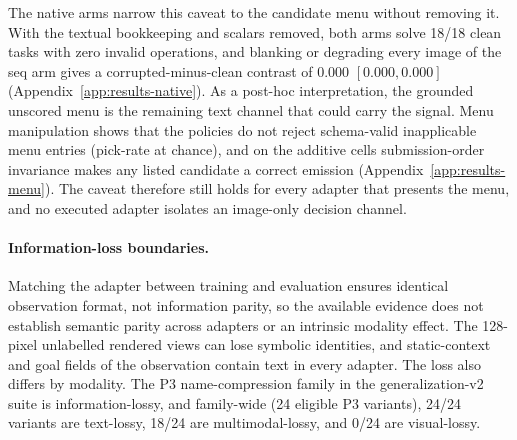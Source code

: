 The native arms narrow this caveat to the candidate menu without removing it. With the textual bookkeeping and scalars removed, both arms solve 18/18 clean tasks with zero invalid operations, and blanking or degrading every image of the seq arm gives a corrupted-minus-clean contrast of $0.000$ $[0.000, 0.000]$ (Appendix~\ref{app:results-native}). As a post-hoc interpretation, the grounded unscored menu is the remaining text channel that could carry the signal. Menu manipulation shows that the policies do not reject schema-valid inapplicable menu entries (pick-rate at chance), and on the additive cells submission-order invariance makes any listed candidate a correct emission (Appendix~\ref{app:results-menu}). The caveat therefore still holds for every adapter that presents the menu, and no executed adapter isolates an image-only decision channel.

\paragraph{Information-loss boundaries.}
Matching the adapter between training and evaluation ensures identical observation format, not information parity, so the available evidence does not establish semantic parity across adapters or an intrinsic modality effect. The 128-pixel unlabelled rendered views can lose symbolic identities, and static-context and goal fields of the observation contain text in every adapter. The loss also differs by modality. The P3 name-compression family in the generalization-v2 suite is information-lossy, and family-wide (24 eligible P3 variants), 24/24 variants are text-lossy, 18/24 are multimodal-lossy, and 0/24 are visual-lossy.


